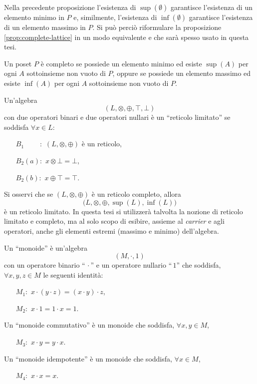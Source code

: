 Nella precedente proposizione l'esistenza di $\sup(\emptyset)$ garantisce
l'esistenza di un elemento minimo in $P$ e, similmente, l'esistenza di
$\inf(\emptyset)$ garantisce l'esistenza di un elemento massimo in $P$.
Si pu\`o perci\`o riformulare la proposizione \ref{prop:complete-lattice} in un
modo equivalente e che sar\`a spesso usato in questa tesi.

\begin{proposizione}
\label{prop:complete-lattice}
{\rm \cite{BS81}} Un poset $P$ \`e completo se possiede un elemento minimo
ed esiste $\sup(A)$ per ogni $A$ sottoinsieme non vuoto di $P$, oppure se
possiede un elemento massimo ed esiste $\inf(A)$ per ogni $A$ sottoinsieme non
vuoto di $P$.
\end{proposizione}

\begin{definizione}
{\rm \cite{BS81}} Un'algebra
\[
    (L, \otimes, \oplus, \top, \bot)
\]
con due operatori binari e due operatori nullari \`e un ``reticolo limitato'' se
soddisfa $\forall x\in L$:
\begin{itemize}
\item[$B_1 \phantom{(a)}:$] $(L, \otimes, \oplus)$ \`e un reticolo,
\item[$B_2 (a):$] $x \otimes \bot = \bot$,
\item[$B_2 (b):$] $x \oplus  \top = \top$.
\end{itemize}
\end{definizione}
Si osservi che se $(L, \otimes, \oplus)$ \`e un reticolo completo, allora
\[
    \bigl(L, \otimes, \oplus, \sup(L), \inf(L)\bigr)
\]
\`e un reticolo limitato. 
In questa tesi si utilizzer\`a talvolta la nozione di reticolo limitato e
completo, ma al solo scopo di esibire, assieme al {\em carrier\/} e agli
operatori, anche gli elementi estremi (massimo e minimo) dell'algebra.

\begin{definizione}
Un ``monoide'' \`e un'algebra
\[
    (M, \cdot, 1)
\]
con un operatore binario ``$\,\cdot$'' e un operatore nullario ``$\,1$'' che
soddisfa, $\forall x,y,z\in M$ le seguenti identit\`a:
\begin{itemize}
\item[$M_1:$] $x \cdot (y \cdot z) = (x \cdot y) \cdot z$,
\item[$M_2:$] $x \cdot 1 = 1 \cdot x = 1$.
\end{itemize}
Un ``monoide commutativo'' \`e un monoide che soddisfa, $\forall x,y \in M$,
\begin{itemize}
\item[$M_3:$] $x \cdot y = y \cdot x$.
\end{itemize}
Un ``monoide idempotente'' \`e un monoide che soddisfa, $\forall x \in M$,
\begin{itemize}
\item[$M_4:$] $x \cdot x = x$.
\end{itemize}
\end{definizione}


